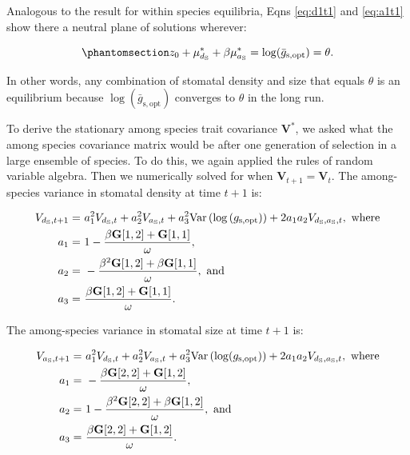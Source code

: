\documentclass[
  letterpaper,
  DIV=11,
  numbers=noendperiod]{scrartcl}
\begin{document}
Analogous to the result for within species equilibria, Eqns
\ref{eq:d1t1} and \ref{eq:a1t1} show there a neutral plane of solutions
wherever:

\begin{equation}\phantomsection\label{eq-mustar1}{z_0 + \mu_{d_{\mathrm{S}}}^* + \beta \mu_{a_{\mathrm{S}}}^* = \log (\bar{g}_\mathrm{s,opt}) = \theta.}\end{equation}

In other words, any combination of stomatal density and size that equals
\(\theta\) is an equilibrium because
\(\log \left( \bar{g}_\mathrm{s,opt} \right)\) converges to \(\theta\)
in the long run.

To derive the stationary among species trait covariance
\(\mathbf{V}^*\), we asked what the among species covariance matrix
would be after one generation of selection in a large ensemble of
species. To do this, we again applied the rules of random variable
algebra. Then we numerically solved for when
\(\mathbf{V}_{t+1} = \mathbf{V}_{t}\). The among-species variance in
stomatal density at time \(t+1\) is:

\begin{align}
\label{eq:Vd1}
V_{d_\mathrm{S}, t + 1} =~ & a_1 ^ 2 V_{d_\mathrm{S}, t} + a_2 ^ 2 V_{a_\mathrm{S}, t} + a_3 ^ 2 \text{Var} \left(\log \left( g_\mathrm{s,opt} \right)\right) + 2 a_1 a_2 V_{d_\mathrm{S}, a_\mathrm{S}, t},~\text{where} \\
a_1 =~ & 1 - \frac{\beta \mathbf{G}[1,2] + \mathbf{G}[1,1]}{\omega}, \notag \\
a_2 =~ & -\frac{\beta ^ 2 \mathbf{G}[1,2] + \beta \mathbf{G}[1,1]}{\omega},~\text{and} \notag \\
a_3 =~ & \frac{\beta \mathbf{G}[1,2] + \mathbf{G}[1,1]}{\omega}. \notag
\end{align}

The among-species variance in stomatal size at time \(t+1\) is:

\begin{align}
\label{eq:Va1}
V_{a_\mathrm{S}, t + 1} =~ & a_1 ^ 2 V_{d_\mathrm{S}, t} + a_2 ^ 2 V_{a_\mathrm{S}, t} + a_3 ^ 2 \text{Var} \left( \log (g_\mathrm{s,opt}) \right) + 2 a_1 a_2 V_{d_\mathrm{S}, a_\mathrm{S}, t},~\text{where} \\
a_1 =~ & -\frac{\beta \mathbf{G}[2, 2] + \mathbf{G}[1, 2]}{\omega}, \notag \\
a_2 =~ & 1 - \frac{\beta ^ 2 \mathbf{G}[2, 2] + \beta \mathbf{G}[1, 2]}{\omega},~\text{and} \notag \\
a_3 =~ & \frac{\beta \mathbf{G}[2, 2] + \mathbf{G}[1, 2]}{\omega}. \notag
\end{align}
\end{document}
